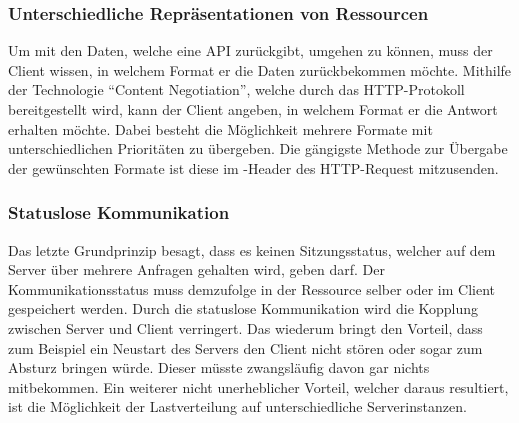 \subsubsection{Unterschiedliche Repräsentationen von Ressourcen}
Um mit den Daten, welche eine \gls{API} zurückgibt, umgehen zu können, muss der Client wissen, in welchem Format er die Daten zurückbekommen möchte. Mithilfe der Technologie \enquote{Content Negotiation}, welche durch das \gls{HTTP}-Protokoll bereitgestellt wird, kann der Client angeben, in welchem Format er die Antwort erhalten möchte. Dabei besteht die Möglichkeit mehrere Formate mit unterschiedlichen Prioritäten zu übergeben. Die gängigste Methode zur Übergabe der gewünschten Formate ist diese im -Header des \gls{HTTP}-Request mitzusenden.

\subsubsection{Statuslose Kommunikation}\label{sec:statelessCommunikation}
Das letzte Grundprinzip besagt, dass es keinen Sitzungsstatus, welcher auf dem Server über mehrere Anfragen gehalten wird, geben darf. Der Kommunikationsstatus muss demzufolge in der Ressource selber oder im Client gespeichert werden. Durch die statuslose Kommunikation wird die Kopplung zwischen Server und Client verringert. Das wiederum bringt den Vorteil, dass zum Beispiel ein Neustart des Servers den Client nicht stören oder sogar zum Absturz bringen würde. Dieser müsste zwangsläufig davon gar nichts mitbekommen. Ein weiterer nicht unerheblicher Vorteil, welcher daraus resultiert, ist die Möglichkeit der Lastverteilung auf unterschiedliche Serverinstanzen.

